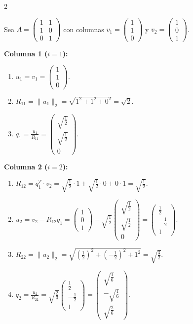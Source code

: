 \documentclass[10pt]{extarticle}
\begin{document}
\begin{multicols}{2}

Sea $A = \begin{pmatrix}1&1\\1&0\\0&1\end{pmatrix}$ con columnas $v_1=\begin{pmatrix}1\\1\\0\end{pmatrix}$ y $v_2=\begin{pmatrix}1\\0\\1\end{pmatrix}$.

\textbf{Columna 1 ($i=1$):}
\begin{enumerate}
\item $u_1 = v_1 = \begin{pmatrix}1\\1\\0\end{pmatrix}$.
\item $R_{11} = \|u_1\|_2 = \sqrt{1^2+1^2+0^2} = \sqrt{2}$.
\item $q_1 = \frac{u_1}{R_{11}} = \begin{pmatrix}\sqrt{\frac12}\\\sqrt{\frac12}\\0\end{pmatrix}$.
\end{enumerate}

\textbf{Columna 2 ($i=2$):}
\begin{enumerate}
\item $R_{12} = q_1^T\cdot v_2 = \sqrt{\frac12}\cdot1+\sqrt{\frac12}\cdot0+0\cdot1=\sqrt{\frac12}$.
\item $u_2 = v_2 - R_{12}q_1 = \begin{pmatrix}1\\0\\1\end{pmatrix}-\sqrt{\frac12}\begin{pmatrix}\sqrt{\frac12}\\\sqrt{\frac12}\\0\end{pmatrix}=\begin{pmatrix}\frac12\\-\frac12\\1\end{pmatrix}$.
\item $R_{22} = \|u_2\|_2 = \sqrt{(\frac12)^2+(-\frac12)^2+1^2}=\sqrt{\frac32}$.
\item $q_2 = \frac{u_2}{R_{22}} = \sqrt{\frac23}\begin{pmatrix}\frac12\\-\frac12\\1\end{pmatrix}=\begin{pmatrix}\sqrt{\frac16}\\-\sqrt{\frac16}\\\sqrt{\frac26}\end{pmatrix}$.
\end{enumerate}


\end{multicols}
\end{document}

